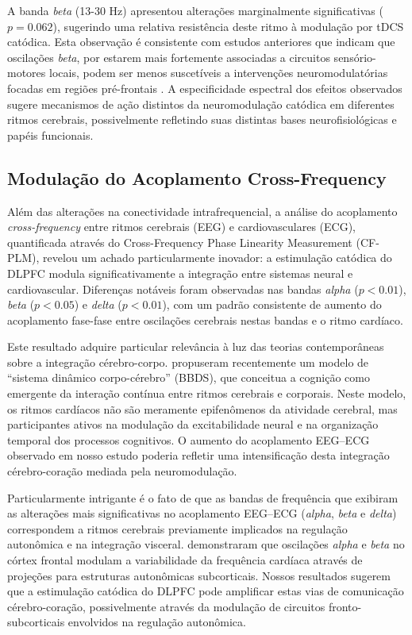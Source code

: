 A banda \emph{beta} (13-30 Hz) apresentou alterações marginalmente significativas ($p = 0.062$), sugerindo uma relativa resistência deste ritmo à modulação por tDCS catódica. Esta observação é consistente com estudos anteriores que indicam que oscilações \emph{beta}, por estarem mais fortemente associadas a circuitos sensório-motores locais, podem ser menos suscetíveis a intervenções neuromodulatórias focadas em regiões pré-frontais \cite{kunze2014high}. A especificidade espectral dos efeitos observados sugere mecanismos de ação distintos da neuromodulação catódica em diferentes ritmos cerebrais, possivelmente refletindo suas distintas bases neurofisiológicas e papéis funcionais.

\subsection{Modulação do Acoplamento Cross-Frequency}
Além das alterações na conectividade intrafrequencial, a análise do acoplamento \emph{cross-frequency} entre ritmos cerebrais (EEG) e cardiovasculares (ECG), quantificada através do Cross-Frequency Phase Linearity Measurement (CF-PLM), revelou um achado particularmente inovador: a estimulação catódica do DLPFC modula significativamente a integração entre sistemas neural e cardiovascular. Diferenças notáveis foram observadas nas bandas \emph{alpha} ($p < 0.01$), \emph{beta} ($p < 0.05$) e \emph{delta} ($p < 0.01$), com um padrão consistente de aumento do acoplamento fase-fase entre oscilações cerebrais nestas bandas e o ritmo cardíaco.

Este resultado adquire particular relevância à luz das teorias contemporâneas sobre a integração cérebro-corpo. \cite{criscuolo2022cognition} propuseram recentemente um modelo de ``sistema dinâmico corpo-cérebro'' (BBDS), que conceitua a cognição como emergente da interação contínua entre ritmos cerebrais e corporais. Neste modelo, os ritmos cardíacos não são meramente epifenômenos da atividade cerebral, mas participantes ativos na modulação da excitabilidade neural e na organização temporal dos processos cognitivos. O aumento do acoplamento EEG--ECG observado em nosso estudo poderia refletir uma intensificação desta integração cérebro-coração mediada pela neuromodulação.

Particularmente intrigante é o fato de que as bandas de frequência que exibiram as alterações mais significativas no acoplamento EEG--ECG (\emph{alpha}, \emph{beta} e \emph{delta}) correspondem a ritmos cerebrais previamente implicados na regulação autonômica e na integração visceral. \cite{criscuolo2022cognition} demonstraram que oscilações \emph{alpha} e \emph{beta} no córtex frontal modulam a variabilidade da frequência cardíaca através de projeções para estruturas autonômicas subcorticais. Nossos resultados sugerem que a estimulação catódica do DLPFC pode amplificar estas vias de comunicação cérebro-coração, possivelmente através da modulação de circuitos fronto-subcorticais envolvidos na regulação autonômica.

